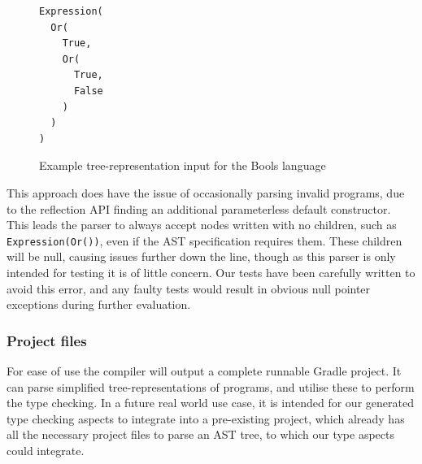 \documentclass[nofilelist]{cslthse-msc}
\newcommand{\CR}[1]{\textcolor{green!60!black}{[\textbf{CR}:#1]}}
\begin{document}
\begin{figure}[h]
\begin{lstlisting}[]
Expression(
  Or(
    True,
    Or(
      True,
      False
    )
  )
)
\end{lstlisting}
  \caption{Example tree-representation input for the Bools language}
  \label{boolinputexample}
\end{figure}

This approach does have the issue of occasionally parsing invalid programs, due to the reflection API finding an additional parameterless default constructor.
This leads the parser to always accept nodes written with no children, such as \lstinline{Expression(Or())}, even if the AST specification requires them.
These children will be null, causing issues further down the line, though as this parser is only intended for testing it is of little concern.
Our tests have been carefully written to avoid this error, and any faulty tests would result in obvious null pointer exceptions during further evaluation.

\subsubsection{Project files}\label{projectfiles}
For ease of use the compiler will output a complete runnable Gradle project.
It can parse simplified tree-representations of programs, and utilise these to perform the type checking.
In a future real world use case, it is intended for our generated type checking aspects to integrate into a pre-existing project, which already has all the necessary project files to parse an AST tree, to which our type aspects could integrate.

\end{document}
